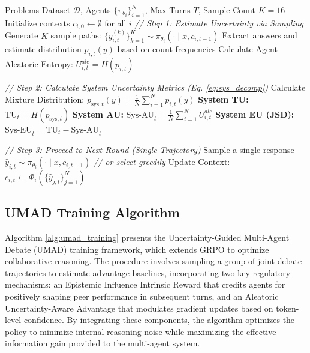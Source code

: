 \documentclass{article}
\theoremstyle{plain}
\theoremstyle{definition}
\theoremstyle{remark}
\begin{document}
\begin{algorithm}[tb]
   \caption{MAD Uncertainty Quantification}
   \label{alg:mad_uncertainty}
\begin{algorithmic}[1]
    Problems Dataset $\mathcal{D}$, Agents $\{\pi_{\theta_i}\}_{i=1}^N$, Max Turns $T$, Sample Count $K=16$
   \STATE Initialize contexts $c_{i, 0} \leftarrow \emptyset$ for all $i$
       \STATE \emph{// Step 1: Estimate Uncertainty via Sampling}
           \STATE Generate $K$ sample paths: $\{y_{i,t}^{(k)}\}_{k=1}^K \sim \pi_{\theta_i}(\cdot \mid x, c_{i, t-1})$
           \STATE Extract answers and estimate distribution $p_{i,t}(y)$ based on count frequencies
           \STATE Calculate Agent Aleatoric Entropy: $U_{i,t}^{ale} = H(p_{i,t})$
       \ENDFOR
       
       \STATE \emph{// Step 2: Calculate System Uncertainty Metrics (Eq. \ref{eq:sys_decomp})}
       \STATE Calculate Mixture Distribution: $p_{\mathrm{sys},t}(y) = \frac{1}{N} \sum_{i=1}^N p_{i,t}(y)$
       \STATE \textbf{System TU:} $\mathrm{TU}_t = H(p_{\mathrm{sys},t})$
       \STATE \textbf{System AU:} $\mathrm{Sys\mbox{-}AU}_t = \frac{1}{N} \sum_{i=1}^N U_{i,t}^{ale}$
       \STATE \textbf{System EU (JSD):} $\mathrm{Sys\mbox{-}EU}_t = \mathrm{TU}_t - \mathrm{Sys\mbox{-}AU}_t$
       
       \STATE \emph{// Step 3: Proceed to Next Round (Single Trajectory)}
           \STATE Sample a single response $\hat{y}_{i,t} \sim \pi_{\theta_i}(\cdot \mid x, c_{i, t-1})$ \emph{// or select greedily}
       \ENDFOR
       \STATE Update Context: $c_{i, t} \leftarrow \Phi_i(\{\hat{y}_{j,t}\}_{j=1}^N)$ 
   \ENDFOR
   \ENDFOR
\end{algorithmic}
\end{algorithm}





\subsection{UMAD Training Algorithm}

Algorithm \ref{alg:umad_training} presents the Uncertainty-Guided Multi-Agent Debate (UMAD) training framework, which extends GRPO to optimize collaborative reasoning. The procedure involves sampling a group of joint debate trajectories to estimate advantage baselines, incorporating two key regulatory mechanisms: an Epistemic Influence Intrinsic Reward that credits agents for positively shaping peer performance in subsequent turns, and an Aleatoric Uncertainty-Aware Advantage that modulates gradient updates based on token-level confidence. By integrating these components, the algorithm optimizes the policy to minimize internal reasoning noise while maximizing the effective information gain provided to the multi-agent system.
\end{document}
